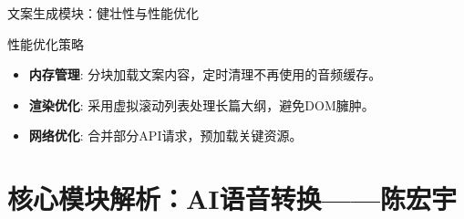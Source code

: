 \documentclass{beamer}
\begin{document}
	
	
	\begin{frame}{文案生成模块：健壮性与性能优化}
		\begin{block}{性能优化策略}
			\begin{itemize}
				\item \textbf{内存管理}: 分块加载文案内容，定时清理不再使用的音频缓存。
				\item \textbf{渲染优化}: 采用虚拟滚动列表处理长篇大纲，避免DOM臃肿。
				\item \textbf{网络优化}: 合并部分API请求，预加载关键资源。
			\end{itemize}
		\end{block}
	\end{frame}
	
	\section{核心模块解析：AI语音转换——陈宏宇}
	
\end{document}
